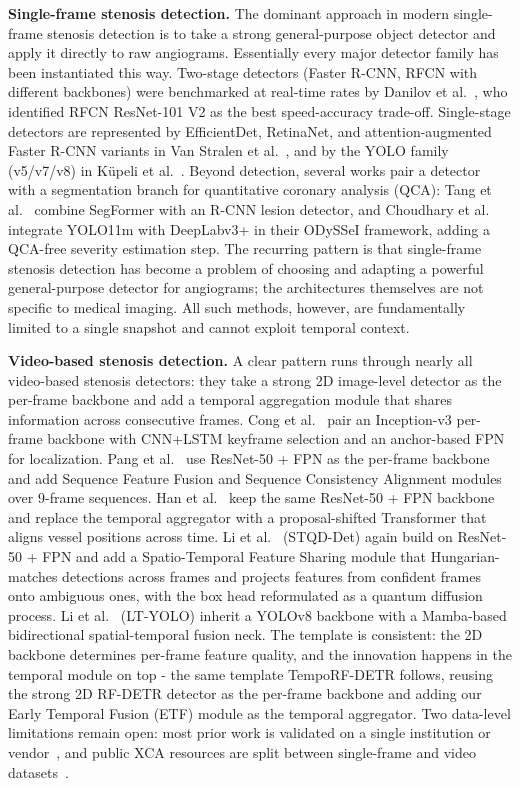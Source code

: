 \documentclass[conference]{IEEEtran}
\begin{document}
\textbf{Single-frame stenosis detection.} The dominant approach in modern single-frame stenosis detection is to take a strong general-purpose object detector and apply it directly to raw angiograms. Essentially every major detector family has been instantiated this way. Two-stage detectors (Faster R-CNN, RFCN with different backbones) were benchmarked at real-time rates by Danilov et al.~\cite{Danilov2021}, who identified RFCN ResNet-101 V2 as the best speed-accuracy trade-off. Single-stage detectors are represented by EfficientDet, RetinaNet, and attention-augmented Faster R-CNN variants in Van Stralen et al.~\cite{attentionstenosis}, and by the YOLO family (v5/v7/v8) in K\"upeli et al.~\cite{kupeli2025yolo}. Beyond detection, several works pair a detector with a segmentation branch for quantitative coronary analysis (QCA): Tang et al.~\cite{aipoweredrealtime} combine SegFormer with an R-CNN lesion detector, and Choudhary et al.~\cite{choudhary2026odysseiopensourceendtoendframework} integrate YOLO11m with DeepLabv3+ in their ODySSeI framework, adding a QCA-free severity estimation step. The recurring pattern is that single-frame stenosis detection has become a problem of choosing and adapting a powerful general-purpose detector for angiograms; the architectures themselves are not specific to medical imaging. All such methods, however, are fundamentally limited to a single snapshot and cannot exploit temporal context.

\textbf{Video-based stenosis detection.} A clear pattern runs through nearly all video-based stenosis detectors: they take a strong 2D image-level detector as the per-frame backbone and add a temporal aggregation module that shares information across consecutive frames. Cong et al.~\cite{fvcm} pair an Inception-v3 per-frame backbone with CNN+LSTM keyframe selection and an anchor-based FPN for localization. Pang et al.~\cite{PANG2021101900} use ResNet-50 + FPN as the per-frame backbone and add Sequence Feature Fusion and Sequence Consistency Alignment modules over 9-frame sequences. Han et al.~\cite{HAN2023106546} keep the same ResNet-50 + FPN backbone and replace the temporal aggregator with a proposal-shifted Transformer that aligns vessel positions across time. Li et al.~\cite{STQD-Det} (STQD-Det) again build on ResNet-50 + FPN and add a Spatio-Temporal Feature Sharing module that Hungarian-matches detections across frames and projects features from confident frames onto ambiguous ones, with the box head reformulated as a quantum diffusion process. Li et al.~\cite{li2025ltyolo} (LT-YOLO) inherit a YOLOv8 backbone with a Mamba-based bidirectional spatial-temporal fusion neck. The template is consistent: the 2D backbone determines per-frame feature quality, and the innovation happens in the temporal module on top - the same template TempoRF-DETR follows, reusing the strong 2D RF-DETR detector as the per-frame backbone and adding our Early Temporal Fusion (ETF) module as the temporal aggregator. Two data-level limitations remain open: most prior work is validated on a single institution or vendor~\cite{cardiovascular}, and public XCA resources are split between single-frame and video datasets~\cite{jimenezpartinen2024cadica, popov2024arcade}.
\end{document}
